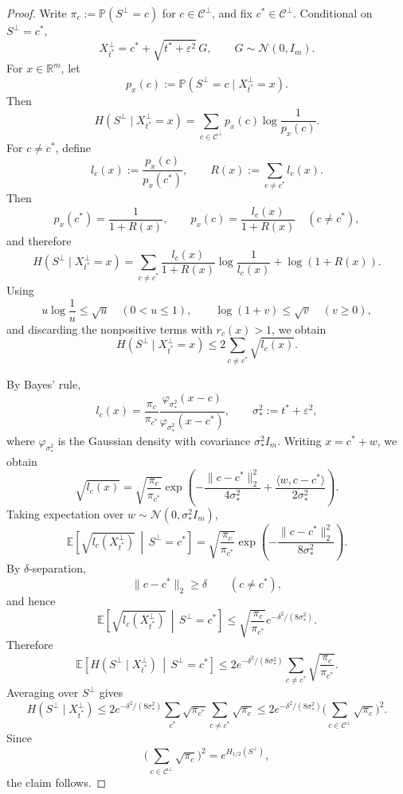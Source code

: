 \documentclass[twoside,11pt]{article}
\newcommand{\R}{\mathbb{R}}
\newcommand{\E}{\mathbb{E}}
\newcommand{\PP}{\mathbb{P}}
\newcommand{\Nc}{\mathcal{N}}
\newcommand{\Cc}{\mathcal{C}}
\numberwithin{equation}{section}
\begin{document}
\begin{proof}
Write \(\pi_c:=\PP(S^\perp=c)\) for \(c\in\Cc^\perp\), and fix \(c^*\in\Cc^\perp\). Conditional on
\(S^\perp=c^*\),
\[
X_{t^*}^\perp=c^*+\sqrt{t^*+\varepsilon^2}\,G,
\qquad
G\sim\Nc(0,I_m).
\]
For \(x\in\R^m\), let
\[
p_x(c):=\PP(S^\perp=c\mid X_{t^*}^\perp=x).
\]
Then
\[
H(S^\perp\mid X_{t^*}^\perp=x)
=
\sum_{c\in\Cc^\perp} p_x(c)\log\frac{1}{p_x(c)}.
\]
For \(c\neq c^*\), define
\[
l_c(x):=\frac{p_x(c)}{p_x(c^*)},
\qquad
R(x):=\sum_{c\neq c^*} l_c(x).
\]
Then
\[
p_x(c^*)=\frac{1}{1+R(x)},
\qquad
p_x(c)=\frac{l_c(x)}{1+R(x)}\quad(c\neq c^*),
\]
and therefore
\[
H(S^\perp\mid X_{t^*}^\perp=x)
=
\sum_{c\neq c^*}\frac{l_c(x)}{1+R(x)}\log\frac{1}{l_c(x)}
+\log(1+R(x)).
\]
Using
\[
u\log\frac{1}{u}\le \sqrt{u}\quad(0<u\le 1),
\qquad
\log(1+v)\le \sqrt{v}\quad(v\ge 0),
\]
and discarding the nonpositive terms with \(r_c(x)>1\), we obtain
\[
H(S^\perp\mid X_{t^*}^\perp=x)
\le
2\sum_{c\neq c^*}\sqrt{l_c(x)}.
\]

By Bayes' rule,
\[
l_c(x)
=
\frac{\pi_c}{\pi_{c^*}}
\frac{\varphi_{\sigma_*^2}(x-c)}{\varphi_{\sigma_*^2}(x-c^*)},
\qquad
\sigma_*^2:=t^*+\varepsilon^2,
\]
where \(\varphi_{\sigma_*^2}\) is the Gaussian density with covariance \(\sigma_*^2I_m\).
Writing \(x=c^*+w\), we obtain
\[
\sqrt{l_c(x)}
=
\sqrt{\frac{\pi_c}{\pi_{c^*}}}
\exp\!\left(
-\frac{\|c-c^*\|_2^2}{4\sigma_*^2}
+
\frac{\langle w,c-c^*\rangle}{2\sigma_*^2}
\right).
\]
Taking expectation over \(w\sim\Nc(0,\sigma_*^2I_m)\),
\[
\E\!\left[\sqrt{l_c(X_{t^*}^\perp)}\,\middle|\,S^\perp=c^*\right]
=
\sqrt{\frac{\pi_c}{\pi_{c^*}}}
\exp\!\left(-\frac{\|c-c^*\|_2^2}{8\sigma_*^2}\right).
\]
By \(\delta\)-separation,
\[
\|c-c^*\|_2\ge \delta
\qquad(c\neq c^*),
\]
and hence
\[
\E\!\left[\sqrt{l_c(X_{t^*}^\perp)}\,\middle|\,S^\perp=c^*\right]
\le
\sqrt{\frac{\pi_c}{\pi_{c^*}}}
e^{-\delta^2/(8\sigma_*^2)}.
\]
Therefore
\[
\E\!\left[H(S^\perp\mid X_{t^*}^\perp)\,\middle|\,S^\perp=c^*\right]
\le
2e^{-\delta^2/(8\sigma_*^2)}
\sum_{c\neq c^*}\sqrt{\frac{\pi_c}{\pi_{c^*}}}.
\]
Averaging over \(S^\perp\) gives
\[
H(S^\perp\mid X_{t^*}^\perp)
\le
2e^{-\delta^2/(8\sigma_*^2)}
\sum_{c^*}\sqrt{\pi_{c^*}}
\sum_{c\neq c^*}\sqrt{\pi_c}
\le
2e^{-\delta^2/(8\sigma_*^2)}
\Big(\sum_{c\in\Cc^\perp}\sqrt{\pi_c}\Big)^2.
\]
Since
\[
\Big(\sum_{c\in\Cc^\perp}\sqrt{\pi_c}\Big)^2=e^{H_{1/2}(S^\perp)},
\]
the claim follows.
\end{proof}
\end{document}
